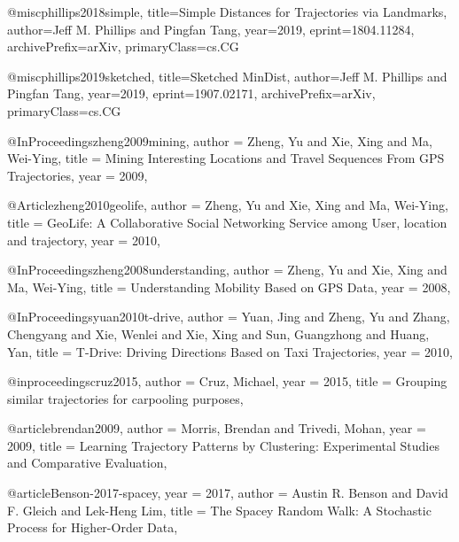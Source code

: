 \documentclass[11pt,a4paper,twocolumn]{article}%
\begin{document}
@misc{phillips2018simple,
    title={Simple Distances for Trajectories via Landmarks},
    author={Jeff M. Phillips and Pingfan Tang},
    year={2019},
    eprint={1804.11284},
    archivePrefix={arXiv},
    primaryClass={cs.CG}
}

@misc{phillips2019sketched,
    title={Sketched MinDist},
    author={Jeff M. Phillips and Pingfan Tang},
    year={2019},
    eprint={1907.02171},
    archivePrefix={arXiv},
    primaryClass={cs.CG}
}

@InProceedings{zheng2009mining,
author = {Zheng, Yu and Xie, Xing and Ma, Wei-Ying},
title = {Mining Interesting Locations and Travel Sequences From GPS Trajectories},
year = {2009},
}

@Article{zheng2010geolife,
author = {Zheng, Yu and Xie, Xing and Ma, Wei-Ying},
title = {GeoLife: A Collaborative Social Networking Service among User, location and trajectory},
year = {2010},
}

@InProceedings{zheng2008understanding,
author = {Zheng, Yu and Xie, Xing and Ma, Wei-Ying},
title = {Understanding Mobility Based on GPS Data},
year = {2008},
}

@InProceedings{yuan2010t-drive,
author = {Yuan, Jing and Zheng, Yu and Zhang, Chengyang and Xie, Wenlei and Xie, Xing and Sun, Guangzhong and Huang, Yan},
title = {T-Drive: Driving Directions Based on Taxi Trajectories},
year = {2010},
}

@inproceedings{cruz2015,
author = {Cruz, Michael},
year = {2015},
title = {Grouping similar trajectories for carpooling purposes},
}

@article{brendan2009,
author = {Morris, Brendan and Trivedi, Mohan},
year = {2009},
title = {Learning Trajectory Patterns by Clustering: Experimental Studies and Comparative Evaluation},
}

@article{Benson-2017-spacey,
  year  = {2017},
  author = {Austin R. Benson and David F. Gleich and Lek-Heng Lim},
  title = {The Spacey Random Walk: A Stochastic Process for Higher-Order Data},
}
\end{document}
